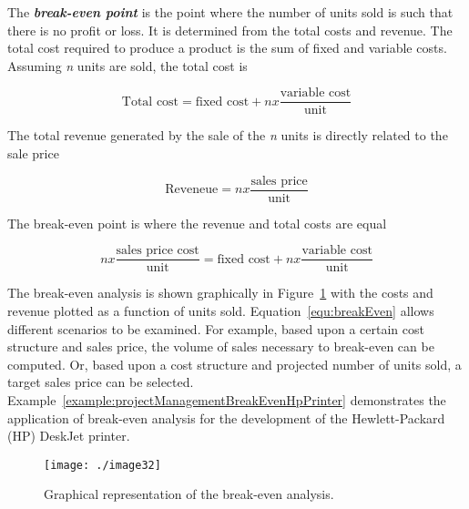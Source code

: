 The \emph{\textbf{break-even point}} is the point where the number of
units sold is such that there is no profit or loss. It is determined
from the total costs and revenue. The total cost required to produce a
product is the sum of fixed and variable costs. Assuming \emph{n} units
are sold, the total cost is

\begin{equation}
\label{equ:totalCost}
\text{Total cost} = \text{fixed cost} + n x\frac{\text{variable cost}}{\text{unit}}
\end{equation}

The total revenue generated by the sale of the \emph{n} units is
directly related to the sale price

\begin{equation}
\label{equ:Revenue}
\text{Reveneue} = n x\frac{\text{sales price}}{\text{unit}}
\end{equation}

The break-even point is where the revenue and total costs are equal

\begin{equation}
\label{equ:breakEven}
n x \frac{\text{sales price cost}}{\text{unit}} = \text{fixed cost} + n x \frac{\text{variable cost}}{\text{unit}}
\end{equation}

The break-even analysis is shown graphically in 
Figure~\ref{figure:breakEvenGraph} with the
costs and revenue plotted as a function of units sold. 
Equation~\ref{equ:breakEven}
allows different scenarios to be examined. For example, based upon a
certain cost structure and sales price, the volume of sales necessary to
break-even can be computed. Or, based upon a cost structure and
projected number of units sold, a target sales price can be selected.
Example~\ref{example:projectManagementBreakEvenHpPrinter} 
demonstrates the application of break-even analysis for the
development of the Hewlett-Packard (HP) DeskJet printer.

\begin{figure}[h]
\texttt{[image: ./image32]}
\caption{Graphical representation of the break-even
analysis.}
\label{figure:breakEvenGraph}
\end{figure}



